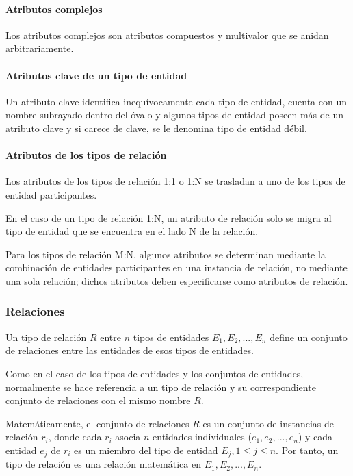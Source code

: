 \paragraph*{Atributos complejos}

Los atributos complejos son atributos compuestos y multivalor que se anidan arbitrariamente.

\paragraph*{Atributos clave de un tipo de entidad}

Un atributo clave identifica inequívocamente cada tipo de entidad, cuenta con un nombre subrayado dentro del óvalo y algunos tipos de entidad poseen más de un atributo clave y si carece de clave, se le denomina tipo de entidad débil.

\paragraph*{Atributos de los tipos de relación}


Los atributos de los tipos de relación 1:1 o 1:N se trasladan a uno de los tipos de entidad participantes.


En el caso de un tipo de relación 1:N, un atributo de relación solo se migra al tipo de entidad que se encuentra en el lado N de la relación. 


Para los tipos de relación M:N, algunos atributos se determinan mediante la combinación de entidades participantes en una instancia de relación, no mediante una sola relación; dichos atributos deben especificarse como atributos de relación.

\subsubsection{Relaciones}

Un tipo de relación $R$ entre $n$ tipos de entidades $E_1, E_2, ..., E_n$ define un conjunto de relaciones entre las entidades de esos tipos de entidades. 


Como en el caso de los tipos de entidades y los conjuntos de entidades, normalmente se hace referencia a un tipo de relación y su correspondiente conjunto de relaciones con el mismo nombre $R$.


Matemáticamente, el conjunto de relaciones $R$ es un conjunto de instancias de relación $r_i$, donde cada $r_i$ asocia $n$ entidades individuales ($e_1, e_2,..., e_n$) y cada entidad $e_j$ de $r_i$ es un miembro del tipo de entidad $E_j, 1 \leq j \leq n$. Por tanto, un tipo de relación es una relación matemática en $E_1, E_2,..., E_n$.



